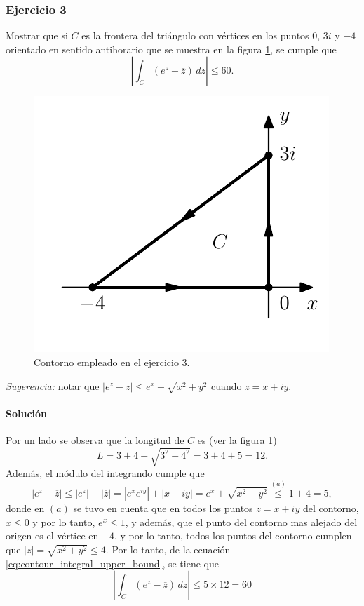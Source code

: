 \documentclass[a4paper]{report}
\begin{document}
\subsubsection{Ejercicio 3}

Mostrar que si \(C\) es la frontera del triángulo con vértices en los puntos \(0\), \(3i\) y \(-4\) orientado en sentido antihorario que se muestra en la figura \ref{fig:exercise_47_03}, se cumple que 
\[
 \left|\int_{C}(e^z-\overline{z})\,dz\right|\leq60.
\]
\begin{figure}[!htb]
 \begin{minipage}[c]{0.35\textwidth}
   \includegraphics[width=\textwidth]{figuras/exercise_47_03.pdf}
 \end{minipage}\hfill
 \begin{minipage}[c]{0.55\textwidth}
  \caption{
       Contorno empleado en el ejercicio 3.
  }\label{fig:exercise_47_03}
 \end{minipage}
\end{figure}

\emph{Sugerencia:} notar que \(|e^z-\overline{z}|\leq e^x+\sqrt{x^2+y^2}\) cuando \(z=x+iy\).

\paragraph{Solución} Por un lado se observa que la longitud de \(C\) es (ver la figura \ref{fig:exercise_47_03})
\[
 L=3+4+\sqrt{3^2+4^2}=3+4+5=12.
\]
Además, el módulo del integrando cumple que 
\[
 |e^z-\overline{z}|\leq|e^z|+|\overline{z}|=|e^xe^{iy}|+|x-iy|=e^x+\sqrt{x^2+y^2}\overset{(a)}{\leq}1+4=5,
\]
donde en \((a)\) se tuvo en cuenta que en todos los puntos \(z=x+iy\) del contorno, \(x\leq0\) y por lo tanto, \(e^x\leq1\), y además, que el punto del contorno mas alejado del origen es el vértice en \(-4\), y por lo tanto, todos los puntos del contorno cumplen que \(|z|=\sqrt{x^2+y^2}\leq4\). Por lo tanto, de la ecuación \ref{eq:contour_integral_upper_bound}, se tiene que 
\[
 \left|\int_{C}(e^z-\overline{z})\,dz\right|\leq5\times12=60
\]
\end{document}
